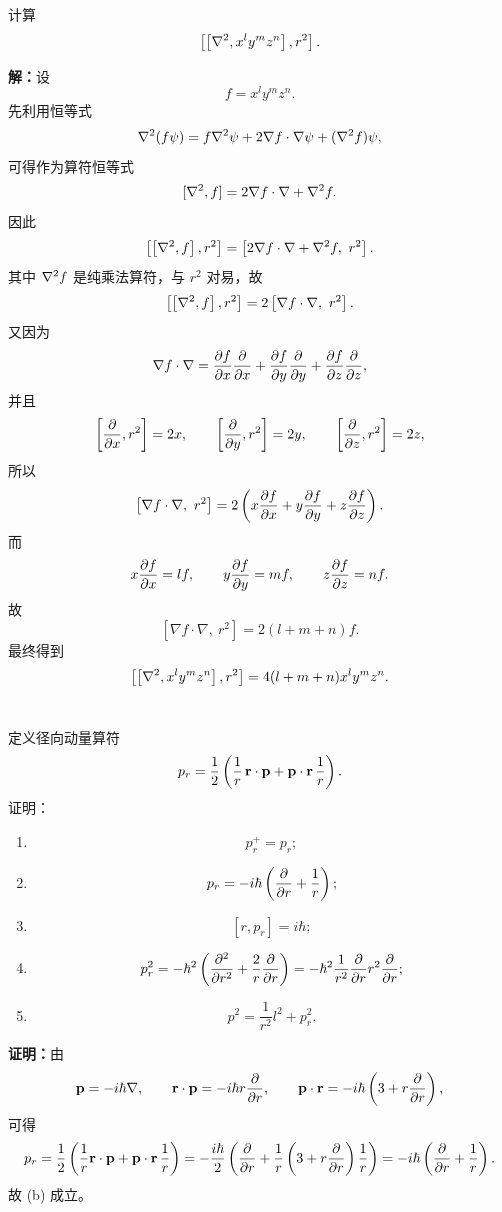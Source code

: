\documentclass[12pt,a4paper]{article}
\begin{document}
\section{}
计算
\[
\left[\left[\laplacian,x^{l}y^{m}z^{n}\right],r^{2}\right].
\]

\noindent\textbf{解：}设
\[
f=x^{l}y^{m}z^{n}.
\]
先利用恒等式
\[
\laplacian(f\psi)=f\laplacian\psi+2\nabla f\cdot \nabla\psi+(\laplacian f)\psi,
\]
可得作为算符恒等式
\[
[\laplacian,f]=2\nabla f\cdot \nabla+\laplacian f.
\]
因此
\[
\left[\left[\laplacian,f\right],r^{2}\right]
=
\left[2\nabla f\cdot \nabla+\laplacian f,\ r^{2}\right].
\]
其中 \(\laplacian f\) 是纯乘法算符，与 \(r^{2}\) 对易，故
\[
\left[\left[\laplacian,f\right],r^{2}\right]
=
2\left[\nabla f\cdot \nabla,\ r^{2}\right].
\]
又因为
\[
\nabla f\cdot \nabla
=
\pdv{f}{x}\pdv{x}
+\pdv{f}{y}\pdv{y}
+\pdv{f}{z}\pdv{z},
\]
并且
\[
\left[\pdv{x},r^{2}\right]=2x,\qquad
\left[\pdv{y},r^{2}\right]=2y,\qquad
\left[\pdv{z},r^{2}\right]=2z,
\]
所以
\[
\left[\nabla f\cdot \nabla,\ r^{2}\right]
=
2\left(
x\pdv{f}{x}+y\pdv{f}{y}+z\pdv{f}{z}
\right).
\]
而
\[
x\pdv{f}{x}=lf,\qquad
y\pdv{f}{y}=mf,\qquad
z\pdv{f}{z}=nf.
\]
故
\[
\left[\nabla f\cdot \nabla,\ r^{2}\right]
=
2(l+m+n)f.
\]
最终得到
\[
\left[\left[\laplacian,x^{l}y^{m}z^{n}\right],r^{2}\right]
=
4(l+m+n)x^{l}y^{m}z^{n}.
\]

\section{}
定义径向动量算符
\[
p_{r}=\frac{1}{2}\left(\frac{1}{r}\,\vb{r}\cdot \vb{p}+\vb{p}\cdot \vb{r}\,\frac{1}{r}\right).
\]
证明：

\begin{enumerate}[label=(\alph*)]
    \item \[p_{r}^{+}=p_{r};\]
    \item
    \[
    p_{r}=-i\hbar \left(\pdv{r}+\frac{1}{r}\right);
    \]
    \item
    \[
    [r,p_{r}]=i\hbar;
    \]
    \item
    \[
    p_{r}^{2}
    =
    -\hbar^{2}\left(\pdv[2]{r}+\frac{2}{r}\pdv{r}\right)
    =
    -\hbar^{2}\frac{1}{r^{2}}\pdv{r}r^{2}\pdv{r};
    \]
    \item
    \[
    p^{2}=\frac{1}{r^{2}}l^{2}+p_{r}^{2}.
    \]
\end{enumerate}

\vspace{0.5cm}

\noindent\textbf{证明：}由
\[
\vb{p}=-i\hbar \nabla,
\qquad
\vb{r}\cdot \vb{p}=-i\hbar r\pdv{r},
\qquad
\vb{p}\cdot \vb{r}=-i\hbar \left(3+r\pdv{r}\right),
\]
可得
\[
p_r
=
\frac{1}{2}\left(\frac{1}{r}\vb r\cdot \vb p+\vb p\cdot \vb r\,\frac{1}{r}\right)
=
-\frac{i\hbar}{2}\left(\pdv{r}+\frac{1}{r}\left(3+r\pdv{r}\right)\frac{1}{r}\right)
=
-i\hbar\left(\pdv{r}+\frac{1}{r}\right).
\]
故 (b) 成立。
\end{document}
